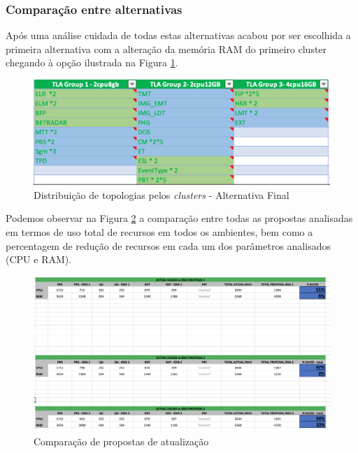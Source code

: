\subsubsection{Comparação entre alternativas}

Após uma análise cuidada de todas estas alternativas acabou por ser escolhida a primeira alternativa
com a alteração da memória RAM do primeiro \gls{cluster} chegando à opção ilustrada na Figura
\ref{proposal-final}.

\begin{figure}[H]
  \centerline{\includegraphics[scale=0.6]{media/content/analise/proposal-final.png}}
  \caption{Distribuição de topologias pelos \textit{clusters} - Alternativa Final}
  \label{proposal-final}
\end{figure}

Podemos observar na Figura \ref{comparison-proposal} a comparação entre todas as propostas
analisadas em termos de uso total de recursos em todos os ambientes, bem como a percentagem de 
redução de recursos em cada um dos parâmetros analisados (CPU e RAM).

\begin{figure}[H]
  \centerline{\includegraphics[scale=0.4]{media/content/analise/proposal-comparison.png}}
  \caption{Comparação de propostas de atualização}
  \label{comparison-proposal}
\end{figure}

